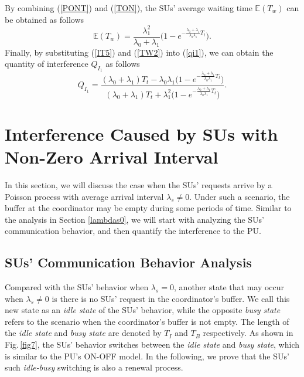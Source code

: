 \documentclass[11pt,draftcls]{IEEEtran}{\onecolumn}
\begin{document}
By combining (\ref{PONT}) and (\ref{TON}), the SUs' average waiting
time $\mathbb{E}(T_w)$ can be obtained as follows
\begin{equation}
\mathbb{E}(T_w)=
\frac{\lambda_1^2}{\lambda_0+\lambda_1}\Big(1-e^{-\frac{\lambda_0+\lambda_1}{\lambda_0\lambda_1}T_t}\Big).\label{TW2}
\end{equation}
Finally, by substituting (\ref{IT5}) and (\ref{TW2}) into
(\ref{qi1}), we can obtain the quantity of interference $Q_{I_1}$ as
follows
\begin{equation}
Q_{I_1}=\frac{(\lambda_0+\lambda_1)T_t-\lambda_0\lambda_1\Big(1-e^{-\frac{\lambda_0+\lambda_1}{\lambda_0\lambda_1}T_t}\Big)}
{(\lambda_0+\lambda_1)T_t+\lambda_1^2\Big(1-e^{-\frac{\lambda_0+\lambda_1}{\lambda_0\lambda_1}T_t}\Big)}.\label{QI1}
\end{equation}

\section{Interference Caused by SUs with Non-Zero Arrival
Interval}\label{lambdasn0}

In this section, we will discuss the case when the SUs' requests
arrive by a Poisson process with average arrival interval $\lambda_s
\neq 0$. Under such a scenario, the buffer at the coordinator may be
empty during some periods of time. Similar to the analysis in
Section \ref{lambdas0}, we will start with analyzing the SUs'
communication behavior, and then quantify the interference to the
PU.

\subsection{SUs' Communication Behavior Analysis}

Compared with the SUs' behavior when $\lambda_s=0$, another state
that may occur when $\lambda_s\neq 0$ is there is no SUs' request in
the coordinator's buffer. We call this new state as an \emph{idle
state} of the SUs' behavior, while the opposite \emph{busy state}
refers to the scenario when the coordinator's buffer is not empty.
The length of the \emph{idle state} and \emph{busy state} are
denoted by $T_I$ and $T_B$ respectively. As shown in
Fig.\,\ref{fig7}, the SUs' behavior switches between the \emph{idle
state} and \emph{busy state}, which is similar to the PU's ON-OFF
model. In the following, we prove that the SUs' such
\emph{idle-busy} switching is also a renewal process.
\end{document}
